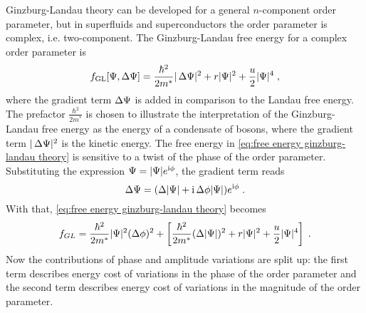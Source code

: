 \documentclass[../notes.tex]{subfiles}
\begin{document}
Ginzburg-Landau theory can be developed for a general \(n\)-component order parameter, but in superfluids and superconductors the order parameter is complex, i.e. two-component.
The Ginzburg-Landau free energy for a complex order parameter is
\begin{equation}
	f_{\mathrm{GL}} [\Psi, \adif{\Psi}] = \frac{\hbar^2}{2m^*} \vert \adif{\Psi} \vert^2 + r \vert \Psi \vert^2 + \frac{u}{2} \vert \Psi \vert^4 \;,
	\label{eq:free energy ginzburg-landau theory}
\end{equation}
where the gradient term \(\adif{\Psi}\) is added in comparison to the Landau free energy.
The prefactor \(\frac{\hbar^2}{2m^*}\) is chosen to illustrate the interpretation of the Ginzburg-Landau free energy as the energy of a condensate of bosons, where the gradient term \(\vert \adif{\Psi} \vert^2\) is the kinetic energy.
The free energy in \cref{eq:free energy ginzburg-landau theory} is sensitive to a twist of the phase of the order parameter.
Substituting the expression \(\Psi = \vert \Psi \vert e^{\mathrm{i} \phi}\), the gradient term reads
\begin{equation}
	\Delta \Psi = (\adif{\vert \Psi \vert} + \iu \adif{\phi} \vert \Psi \vert) e^{\iu \phi} \;.
\end{equation}
With that, \cref{eq:free energy ginzburg-landau theory} becomes
\begin{equation}
	f_{GL}  = \frac{\hbar^2}{2m^*} \vert \Psi \vert^2 (\adif{\phi})^2 + \left[ \frac{\hbar^2}{2m^*} (\adif{\vert \Psi \vert})^2 + r \vert \Psi \vert^2 + \frac{u}{2} \vert \Psi \vert^4 \right] \;.
	\label{eq:free energy ginzburg-landau theory with phase}
\end{equation}
Now the contributions of phase and amplitude variations are split up: the first term describes energy cost of variations in the phase of the order parameter and the second term describes energy cost of variations in the magnitude of the order parameter.
\end{document}
